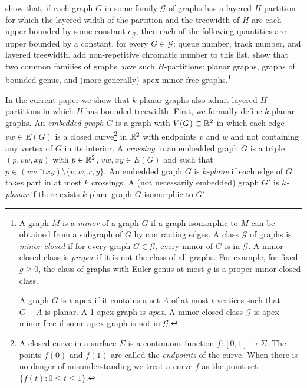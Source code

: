 \documentclass{patmorin}
\begin{document}
 \citet{dujmovic.joret.ea:planar} show that, if each graph $G$ in some family $\mathcal{G}$ of graphs has a layered $H$-partition for which the layered width of the partition and the treewidth of $H$ are each upper-bounded by some constant $c_\mathcal{G}$, then each of the following quantities are upper bounded by a constant, for every $G\in\mathcal{G}$: queue number, track number, and layered treewidth. \citet{dujmovic.esperet.ea:planar} add non-repetitive chromatic number to this list.  \citet{dujmovic.joret.ea:planar} show that two common families of graphs have such $H$-partitions: planar graphs, graphs of bounded genus, and (more generally) apex-minor-free graphs.\footnote{A graph $M$ is a \textit{minor} of a graph $G$ if a graph isomorphic to $M$ can be obtained from a subgraph of $G$ by contracting edges. A class $\mathcal{G}$ of graphs is \emph{minor-closed} if for every graph $G\in\mathcal{G}$, every minor of $G$ is in $\mathcal{G}$. A minor-closed class is \emph{proper} if it is not the class of all graphs. For example, for fixed $g\geq 0$, the class of graphs with Euler genus at most $g$ is a proper minor-closed class.
 
 A graph $G$ is $t$-apex if it contains a set $A$ of at most $t$ vertices such that $G-A$ is planar. A 1-apex graph is \emph{apex}.  A minor-closed class $\mathcal{G}$ is apex-minor-free if some apex graph is not in $\mathcal{G}$.}

In the current paper we show that $k$-planar graphs also admit layered $H$-partitions in which $H$ has bounded treewidth. First, we formally define $k$-planar graphs.  An \emph{embedded graph} $G$ is a graph with $V(G)\subset\mathbb{R}^2$ in which each edge $vw\in E(G)$ is a closed curve\footnote{A closed curve in a surface $\Sigma$ is a continuous function $f:[0,1]\to \Sigma$. The points $f(0)$ and $f(1)$ are called the \emph{endpoints} of the curve.  When there is no danger of misunderstanding we treat a curve $f$ as the point set $\{f(t):0\le t\le 1\}$.} in $\mathbb{R}^2$ with endpoints $v$ and $w$ and not containing any vertex of $G$ in its interior.  A \emph{crossing} in an embedded graph $G$ is a triple $(p,vw,xy)$ with $p\in\mathbb{R}^2$, $vw,xy\in E(G)$ and such that $p\in (vw\cap xy)\setminus\{v,w,x,y\}$. An embedded graph $G$ is \emph{$k$-plane} if each edge of $G$ takes part in at most $k$ crossings.  A (not necessarily embedded) graph $G'$ is \emph{$k$-planar} if there exists $k$-plane graph $G$ isomorphic to $G'$.  
\end{document}
